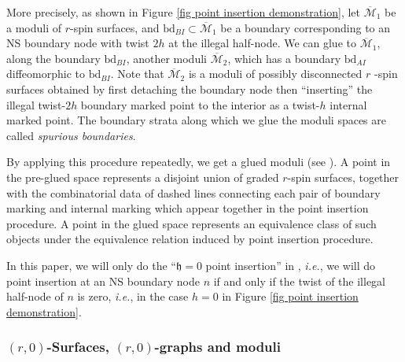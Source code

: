 \documentclass[11pt]{amsart}
\theoremstyle{definition}
\theoremstyle{remark}
\newcommand{\<}{\left<}
\renewcommand{\>}{\right>}
\numberwithin{equation}{section}
\def\Mbar{{\overline{\mathcal M}}}
\def\h{{\mathfrak h}}
\begin{document}
More precisely, as shown in Figure \ref{fig point insertion demonstration}, let $\Mbar_1$ be a moduli of $r$-spin surfaces, and $\text{bd}_{BI}\subset \Mbar_1$ be a boundary corresponding to an NS boundary node with twist $2h$ at the illegal half-node. We can glue to $\Mbar_1$, along the boundary $\text{bd}_{BI}$, another %
moduli $\Mbar_2$, which %
has a boundary $\text{bd}_{AI}$ diffeomorphic to $\text{bd}_{BI}$. Note that $\Mbar_2$ is a moduli of possibly disconnected $r$%
-spin surfaces obtained %
by first detaching the %
boundary node then %
``inserting'' the illegal twist-$2h$ boundary marked point to the interior as a twist-$h$ internal marked point. The boundary strata along which we glue the moduli spaces are called \emph{spurious boundaries}.

By applying this %
procedure repeatedly, we %
get a glued moduli (see \cite[\S 4.6]{TZ1}). A point in the pre-glued space represents a disjoint union of graded $r$-spin surfaces, together with the combinatorial data of dashed lines connecting each pair of boundary marking and internal marking which appear together in the point insertion procedure. A point in the glued space represents an equivalence class of such objects under the equivalence relation induced by point insertion procedure.

In this paper, we will only do the ``$\h=0$ point insertion'' in \cite{TZ1}, \textit{i.e.}, we will  do point insertion at an NS boundary node $n$ if and only if the twist of the illegal half-node of $n$ is zero, \textit{i.e.}, in the case $h=0$ in %
Figure \ref{fig point insertion demonstration}.



\subsubsection{$(r,0)$-Surfaces, $(r,0)$-graphs and moduli}
\end{document}
